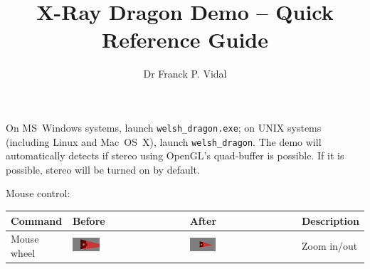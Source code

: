 \documentclass[10pt]{article}
\author{Dr Franck P. Vidal}
\title{X-Ray Dragon Demo -- Quick Reference Guide}
\begin{document}
\maketitle

On MS~Windows systems, launch \texttt{welsh\_dragon.exe}; on UNIX systems (including Linux and Mac~OS~X), launch \texttt{welsh\_dragon}. 
The demo will automatically detects if stereo using OpenGL's quad-buffer is possible. 
If it is possible, stereo will be turned on by default.

Mouse control:
\begin{center}
    \begin{longtable}{|m{}|m{}|m{}|m{}|}
		\hline
		\textbf{Command}	&	\textbf{Before}	&	\textbf{After}	&	\multicolumn{1}{c|}{\textbf{Description}}	\\
		\hline
		\hline
		Mouse wheel	&	\includegraphics[width=0.25\textwidth]{mouse_wheel_zoom_in.png}	&	\includegraphics[width=0.25\textwidth]{mouse_wheel_zoom_out.png}	&	Zoom in/out\\

\end{longtable}
\end{center}
\end{document}

